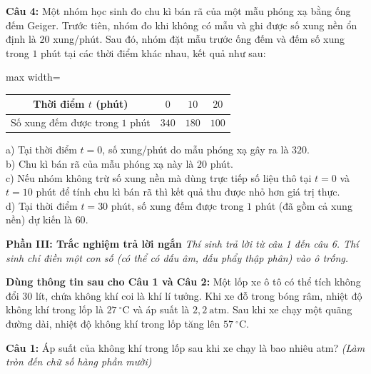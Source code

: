 \documentclass[12pt,a4paper]{article}
\begin{document}
\begin{minipage}{\textwidth}
\noindent \textbf{Câu 4:} Một nhóm học sinh đo chu kì bán rã của một mẫu phóng xạ bằng ống đếm Geiger. Trước tiên, nhóm đo khi không có mẫu và ghi được số xung nền ổn định là $20$ xung/phút. Sau đó, nhóm đặt mẫu trước ống đếm và đếm số xung trong $1$ phút tại các thời điểm khác nhau, kết quả như sau:\\
\begin{center}
\begin{adjustbox}{max width=\linewidth}
\begin{tabular}{|c|c|c|c|}
\hline
Thời điểm $t$ (phút) & $0$ & $10$ & $20$\\
\hline
Số xung đếm được trong $1$ phút & $340$ & $180$ & $100$\\
\hline
\end{tabular}
\end{adjustbox}
\end{center}
\noindent a) Tại thời điểm $t = 0$, số xung/phút do mẫu phóng xạ gây ra là $320$.\\

\noindent b) Chu kì bán rã của mẫu phóng xạ này là $20$ phút.\\

\noindent c) Nếu nhóm không trừ số xung nền mà dùng trực tiếp số liệu thô tại $t = 0$ và $t = 10$ phút để tính chu kì bán rã thì kết quả thu được nhỏ hơn giá trị thực.\\

\noindent d) Tại thời điểm $t = 30$ phút, số xung đếm được trong $1$ phút (đã gồm cả xung nền) dự kiến là $60$.
\end{minipage}

\vspace{0.5cm}
\textbf{Phần III: Trắc nghiệm trả lời ngắn} \textit{Thí sinh trả lời từ câu 1 đến câu 6. Thí sinh chỉ điền một con số (có thể có dấu âm, dấu phẩy thập phân) vào ô trống.}

\noindent \textbf{Dùng thông tin sau cho Câu 1 và Câu 2:} Một lốp xe ô tô có thể tích không đổi $30$ lít, chứa không khí coi là khí lí tưởng. Khi xe đỗ trong bóng râm, nhiệt độ không khí trong lốp là $27\ ^{\circ}\text{C}$ và áp suất là $2{,}2\ \text{atm}$. Sau khi xe chạy một quãng đường dài, nhiệt độ không khí trong lốp tăng lên $57\ ^{\circ}\text{C}$.\\\par\nopagebreak[4]

\begin{minipage}{\textwidth}
\noindent \textbf{Câu 1:} Áp suất của không khí trong lốp sau khi xe chạy là bao nhiêu atm? \textit{(Làm tròn đến chữ số hàng phần mười)}
\end{minipage}
\end{document}
